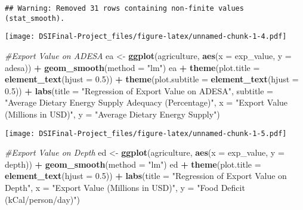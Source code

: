 \documentclass[
]{article}
\newenvironment{Shaded}{\begin{snugshade}}{\end{snugshade}}
\newcommand{\CommentTok}[1]{\textcolor[rgb]{0.56,0.35,0.01}{\textit{#1}}}
\newcommand{\DataTypeTok}[1]{\textcolor[rgb]{0.13,0.29,0.53}{#1}}
\newcommand{\FloatTok}[1]{\textcolor[rgb]{0.00,0.00,0.81}{#1}}
\newcommand{\KeywordTok}[1]{\textcolor[rgb]{0.13,0.29,0.53}{\textbf{#1}}}
\newcommand{\NormalTok}[1]{#1}
\newcommand{\OperatorTok}[1]{\textcolor[rgb]{0.81,0.36,0.00}{\textbf{#1}}}
\newcommand{\StringTok}[1]{\textcolor[rgb]{0.31,0.60,0.02}{#1}}
\begin{document}
\begin{verbatim}
## Warning: Removed 31 rows containing non-finite values (stat_smooth).
\end{verbatim}

\texttt{[image: DSIFinal-Project\_files/figure-latex/unnamed-chunk-1-4.pdf]}

\begin{Shaded}
\begin{Highlighting}[]
\CommentTok{#Export Value on ADESA}
\NormalTok{ea <-}\StringTok{ }\KeywordTok{ggplot}\NormalTok{(agriculture, }\KeywordTok{aes}\NormalTok{(}\DataTypeTok{x =}\NormalTok{ exp_value, }\DataTypeTok{y =}\NormalTok{ adesa)) }\OperatorTok{+}\StringTok{ }\KeywordTok{geom_smooth}\NormalTok{(}\DataTypeTok{method =} \StringTok{"lm"}\NormalTok{)}
\NormalTok{ea }\OperatorTok{+}\StringTok{ }\KeywordTok{theme}\NormalTok{(}\DataTypeTok{plot.title =} \KeywordTok{element_text}\NormalTok{(}\DataTypeTok{hjust =} \FloatTok{0.5}\NormalTok{)) }\OperatorTok{+}\StringTok{ }
\StringTok{  }\KeywordTok{theme}\NormalTok{(}\DataTypeTok{plot.subtitle =} \KeywordTok{element_text}\NormalTok{(}\DataTypeTok{hjust =} \FloatTok{0.5}\NormalTok{)) }\OperatorTok{+}\StringTok{ }
\StringTok{  }\KeywordTok{labs}\NormalTok{(}\DataTypeTok{title =} \StringTok{"Regression of Export Value on ADESA"}\NormalTok{, }
       \DataTypeTok{subtitle =} \StringTok{"Average Dietary Energy Supply Adequacy (Percentage)"}\NormalTok{,}
       \DataTypeTok{x =} \StringTok{"Export Value (Millions in USD)"}\NormalTok{, }\DataTypeTok{y =} \StringTok{"Average Dietary Energy Supply"}\NormalTok{)}
\end{Highlighting}
\end{Shaded}

\texttt{[image: DSIFinal-Project\_files/figure-latex/unnamed-chunk-1-5.pdf]}

\begin{Shaded}
\begin{Highlighting}[]
\CommentTok{#Export Value on Depth}
\NormalTok{ed <-}\StringTok{ }\KeywordTok{ggplot}\NormalTok{(agriculture, }\KeywordTok{aes}\NormalTok{(}\DataTypeTok{x =}\NormalTok{ exp_value, }\DataTypeTok{y =}\NormalTok{ depth)) }\OperatorTok{+}\StringTok{ }\KeywordTok{geom_smooth}\NormalTok{(}\DataTypeTok{method =} \StringTok{"lm"}\NormalTok{)}
\NormalTok{ed }\OperatorTok{+}\StringTok{ }\KeywordTok{theme}\NormalTok{(}\DataTypeTok{plot.title =} \KeywordTok{element_text}\NormalTok{(}\DataTypeTok{hjust =} \FloatTok{0.5}\NormalTok{)) }\OperatorTok{+}\StringTok{ }
\StringTok{  }\KeywordTok{labs}\NormalTok{(}\DataTypeTok{title =} \StringTok{"Regression of Export Value on Depth"}\NormalTok{, }
       \DataTypeTok{x =} \StringTok{"Export Value (Millions in USD)"}\NormalTok{, }\DataTypeTok{y =} \StringTok{"Food Deficit (kCal/person/day)"}\NormalTok{)}
\end{Highlighting}
\end{Shaded}
\end{document}
